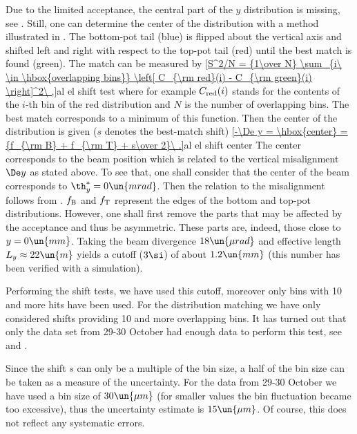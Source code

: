 Due to the limited acceptance, the central part of the $y$ distribution is missing, see . Still, one can determine the center of the distribution with a method illustrated in . The bottom-pot tail (blue) is flipped about the vertical axis and shifted left and right with respect to the top-pot tail (red) until the best match is found (green). The match can be measured by
\eqref{S^2/N = {1\over N} \sum_{i\ \in \hbox{overlapping bins}} \left[ C_{\rm red}(i) - C_{\rm green}(i) \right]^2\ ,}{al el shift test}
where for example $C_{\rm red}(i)$ stands for the contents of the $i$-th bin of the red distribution and $N$ is the number of overlapping bins. The best match corresponds to a minimum of this function. Then the center of the distribution is given ($s$ denotes the best-match shift)
\eqref{-\De y = \hbox{center} = {f_{\rm B} + f_{\rm T} + s\over 2}\ .}{al el shift center}
The center corresponds to the beam position which is related to the vertical misalignment $\De y$ as stated above. To see that, one shall consider that the center of the beam corresponds to $\th_y^* = 0\un{mrad}$. Then the relation to the misalignment follows from . $f_{\rm B}$ and $f_{\rm T}$ represent the edges of the bottom and top-pot distributions. However, one shall first remove the parts that may be affected by the acceptance and thus be asymmetric. These parts are, indeed, those close to $y=0\un{mm}$. Taking the beam divergence $18\un{\mu rad}$ and effective length $L_y\approx 22\un{m}$ yields a cutoff ($3\si$) of about $1.2\un{mm}$ (this number has been verified with a  simulation).

Performing the shift tests, we have used this cutoff, moreover only bins with 10 and more hits have been used. For the distribution matching we have only considered shifts providing 10 and more overlapping bins. It has turned out that only the data set from 29-30 October had enough data to perform this test, see  and .


Since the shift $s$ can only be a multiple of the bin size, a half of the bin size can be taken as a measure of the uncertainty. For the data from 29-30 October we have used a bin size of $30\un{\mu m}$ (for smaller values the bin fluctuation became too excessive), thus the uncertainty estimate is $15\un{\mu m}$. Of course, this does not reflect any systematic errors. 

